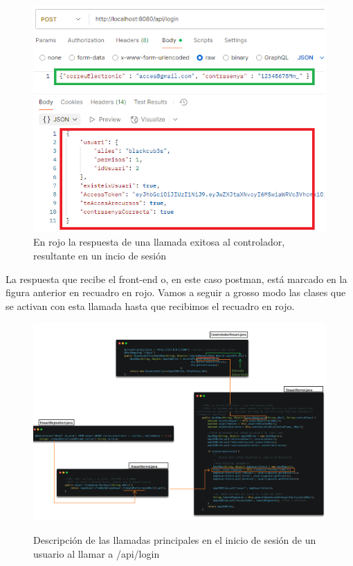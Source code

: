 \documentclass[a4paper,12pt]{report}
\begin{document}
				
				\FloatBarrier
				\begin{figure}[H]
					\centering
					\caption{En rojo la respuesta de una llamada exitosa al controlador, resultante en un incio de sesión}
					\includegraphics[width=1\linewidth]{img/apiLoginSpringBoot}

					\label{fig:apiloginspringboot}
				\end{figure}
				\FloatBarrier

				La respuesta que recibe el front-end o, en este caso postman, está marcado en la figura anterior en recuadro en rojo. Vamos a seguir a grosso modo las clases que se activan con esta llamada hasta que recibimos el recuadro en rojo.
				
				\FloatBarrier
				\setlength{\belowcaptionskip}{3pt}
				\begin{figure}[H]
					\centering
					\caption{Descripción de las llamadas principales en el inicio de sesión de un usuario al llamar a /api/login}
					\includegraphics[width=1\linewidth]{img/esquemaArquitecturaSpringboot}
					\label{fig:esquemaArquitecturaSpringboot}
				\end{figure}
				\FloatBarrier
				
\end{document}
